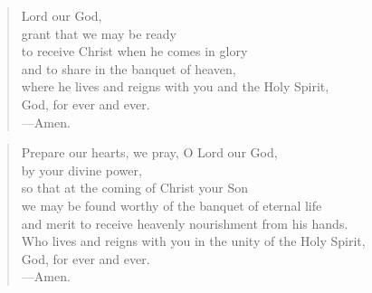 \prayer

\setlength{\vleftmargin}{\prayerleftmargini}

\begin{verse}
Lord our God,\\
grant that we may be ready\\
to receive Christ when he comes in glory\\
and to share in the banquet of heaven,\\
where he lives and reigns with you and the Holy Spirit,\\
God, for ever and ever.\\
{\color{red}---\thinspace}Amen.
\end{verse}


\begin{verse}
Prepare our hearts, we pray, O Lord our God,\\
by your divine power,\\
so that at the coming of Christ your Son\\
we may be found worthy of the banquet of eternal life\\
and merit to receive heavenly nourishment from his hands.\\
Who lives and reigns with you in the unity of the Holy Spirit,\\
God, for ever and ever.\\
{\color{red}---\thinspace}Amen.
\end{verse}

\setlength{\vleftmargin}{\defleftmargini}